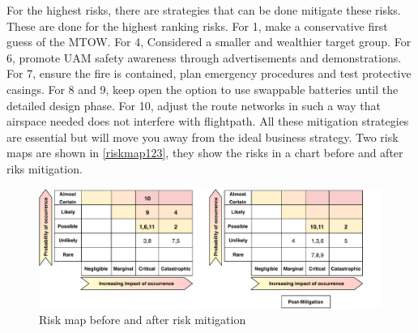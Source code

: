 For the highest risks, there are strategies that can be done mitigate these risks. These are done for the highest ranking risks. For 1, make a conservative first guess of the MTOW. For 4, Considered a smaller and wealthier target group. For 6, promote UAM safety awareness through advertisements and demonstrations. For 7, ensure the fire is contained, plan emergency procedures and test protective casings. For 8 and 9, keep open the option to use swappable batteries until the detailed design phase. For 10, adjust the route networks in such a way that airspace needed does not interfere with flightpath. All these mitigation strategies are essential but will move you away from the ideal business strategy. Two risk maps are shown in \autoref{riskmap123}, they show the risks in a chart before and after riks mitigation. 

\begin{figure}[H]
    \centering
    \includegraphics{Figures/riskmap.pdf}
    \caption{Risk map before and after risk mitigation}
    \label{riskmap123}
\end{figure}


